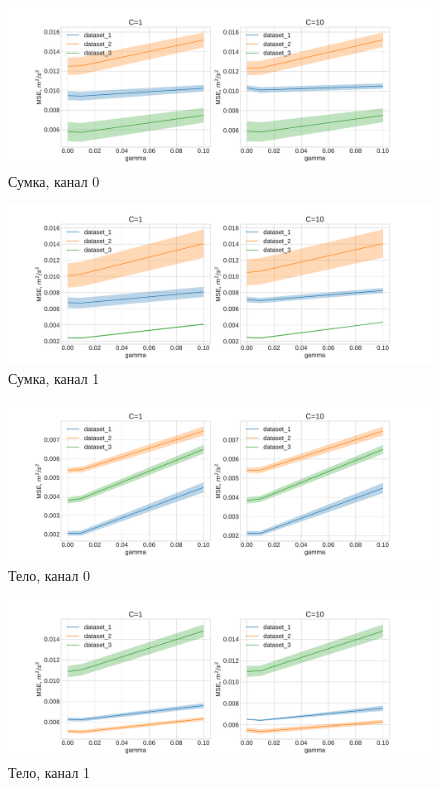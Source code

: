 \documentclass{article}
\begin{document}
    \begin{figure}[H]
    \includegraphics[scale=0.4]{charts/bag_chn0_C=10.pdf}
    \caption{Сумка, канал 0}
    \label{fig:image}
    \end{figure}
    
    \begin{figure}[H]
    \includegraphics[scale=0.4]{charts/bag_chn1_C=10.pdf}
    \caption{Сумка, канал 1}
    \label{fig:image}
    \end{figure}
    
    \begin{figure}[H]
    \includegraphics[scale=0.4]{charts/body_chn0_C=10.pdf}
    \caption{Тело, канал 0}
    \label{fig:image}
    \end{figure}
    
    \begin{figure}[H]
    \includegraphics[scale=0.4]{charts/body_chn1_C=10.pdf}
    \caption{Тело, канал 1}
    \label{fig:image}
    \end{figure}
    
\end{document}
